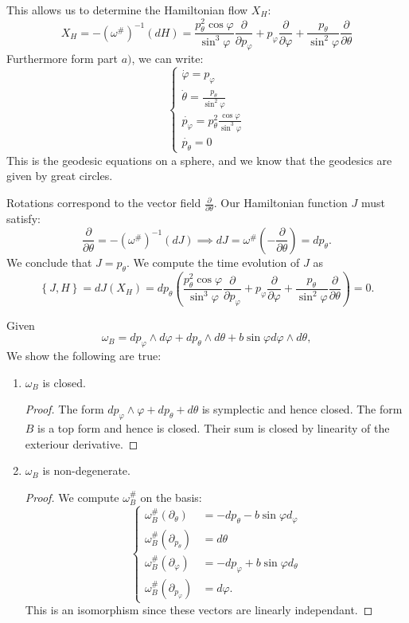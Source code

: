\documentclass[12pt, a4paper]{article}
\theoremstyle{definition}
\begin{document}
This allows us to determine the Hamiltonian flow $X_H$:
$$ X_H  = - \left( \omega^\# \right)^{-1} (dH) = \frac{ p_\theta^2 \cos \varphi }{ \sin^3 \varphi } \frac{ \partial  }{ \partial p_\varphi } + p_\varphi \frac{ \partial  }{ \partial \varphi } + \frac{ p_\theta }{ \sin^2 \varphi } \frac{ \partial  }{ \partial \theta } $$ 
Furthermore form part $a)$, we can write:
$$ \begin{cases}
	\dot{\varphi} = p_\varphi
	\\ \dot{\theta} = \frac{ p_\theta }{ \sin^2 \varphi }
	\\ \dot{p_\varphi} = p_\theta^2 \frac{ \cos \varphi }{ \sin^3 \varphi }
	\\ \dot{p_\theta} = 0
\end{cases}$$ 
This is the geodesic equations on a sphere, and we know that the geodesics are given by great circles. 
\item Rotations correspond to the vector field $ \frac{ \partial  }{ \partial \theta }$. Our Hamiltonian function $J$ must satisfy: $$ \frac{ \partial  }{ \partial \theta } = - \left(\omega^\# \right)^{-1} (dJ) \implies dJ = \omega^\# \left( - \frac{ \partial  }{ \partial \theta } \right) = dp_{\theta}.$$ 
We conclude that $J= p_\theta.$
We compute the time evolution of $J$ as
$$ \left\{ J,H \right\} = dJ(X_H) =  dp_\theta \left( \frac{ p_\theta^2 \cos \varphi }{ \sin^3 \varphi } \frac{ \partial  }{ \partial p_\varphi } + p_\varphi \frac{ \partial  }{ \partial \varphi } + \frac{ p_\theta }{ \sin^2 \varphi } \frac{ \partial  }{ \partial \theta }  \right)  = 0.$$ 
\item Given $$ \omega_B = dp_\varphi \wedge d \varphi + dp_\theta \wedge d\theta + b \sin \varphi d \varphi \wedge d \theta, $$ 
We show the following are true:
\begin{enumerate}[label = \textbf{\roman*)}, leftmargin = 0pt]
	\item $\omega_B$ is closed. 
		\begin{proof}
The form $dp_\varphi \wedge \varphi + dp_\theta + d\theta$ is symplectic and hence closed. The form $B$ is a top form and hence is closed. Their sum is closed by linearity of the exteriour derivative.
		\end{proof}
	\item $\omega_B$ is non-degenerate. 
		\begin{proof}
		We compute $\omega_B^\#$ on the basis:
			$$ \begin{cases} 
				\omega_B^\# \left( \partial_\theta \right) &= - dp_\theta - b \sin \varphi d_\varphi
				\\ \omega_B^\# \left( \partial_{p_\theta} \right) & = d\theta
				\\ \omega_B^\# \left( \partial_\varphi \right) & = -dp_\varphi	+ b \sin \varphi d_\theta
				\\ \omega^\#_B \left( \partial_{p_\varphi} \right)& = d\varphi.
			\end{cases}$$ 
This is an isomorphism since these vectors are linearly independant. 
	\end{proof}
\end{enumerate}
\end{document}
